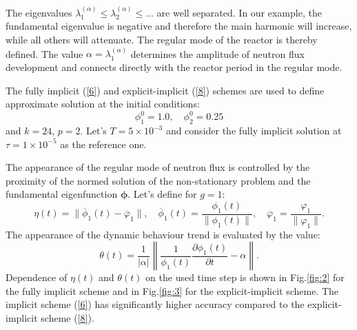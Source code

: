 \documentclass{llncs}
\begin{document}
The eigenvalues  $\lambda_1^{(\alpha)} \leq  \lambda_2^{(\alpha)} \leq ...$
are well separated. In our example, the fundamental eigenvalue is negative and therefore the main harmonic will increase, while all others will attenuate. The regular mode of the reactor is thereby defined. The value $\alpha = \lambda_1^{(\alpha)}$ determines the amplitude of neutron flux development and connects directly with the reactor period in the regular mode.

The fully implicit (\ref{6}) and explicit-implicit (\ref{8}) schemes are used to define approximate solution at the initial conditions:
\[ 
\phi_1^0 = 1.0, \quad \phi_2^0 = 0.25
\]
and  $k=24$, $p=2$. Let's $T=5\times 10^{-3}$ and consider the fully implicit solution at $\tau = 1 \times 10^{-5}$ as the reference one. 

The appearance of the regular mode of neutron flux is controlled by the proximity of the normed solution of the non-stationary problem 
and the fundamental eigenfunction $\bm \phi$. Let's define for $g=1$:
\[
 \eta(t) = \|\overline{\phi}_1(t) - \overline{\varphi}_1\|, 
 \quad  \overline{\phi}_1(t) = \frac{\phi_1(t)}{\|\phi_1(t)\|} ,
 \quad  \overline{\varphi}_1 = \frac{\varphi_1}{\|\varphi_1\|} .
\] 
The appearance of the dynamic behaviour trend is evaluated by the value:
\[
 \theta(t) = \frac{1}{|\alpha|} \left \| \frac{1}{\phi_1(t)}\frac{\partial \phi_1(t)}{\partial t} - \alpha \right \|.
\] 
Dependence of $\eta(t)$ and $\theta(t)$ on the used time step is shown in Fig.\ref{fig:2} 
for the fully implicit scheme and in Fig.\ref{fig:3} for the explicit-implicit scheme.
The implicit scheme (\ref{6}) has significantly higher accuracy compared to the explicit-implicit scheme (\ref{8}).
\end{document}
